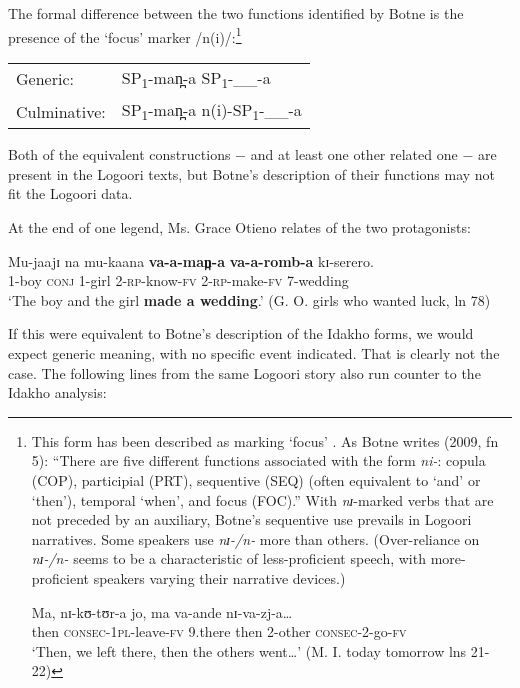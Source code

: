 \documentclass[output=paper]{langsci/langscibook}
\begin{document}
The formal difference between the two functions identified by Botne is the presence of the ‘focus’ marker /n(i)/:\footnote{ This form has been described as marking ‘focus’ \citep{Dalgish1979,Nurse2006,Botne2009}. As Botne writes (2009, fn 5): “There are five different functions associated with the form \textit{ni-}: copula (COP), participial (PRT), sequentive (SEQ) (often equivalent to ‘and’ or ‘then’), temporal ‘when’, and focus (FOC).” With \textit{nɪ}{}-marked verbs that are not preceded by an auxiliary, Botne’s sequentive use prevails in Logoori narratives. Some speakers use \textit{nɪ-/n- }more than others. (Over-reliance on \textit{nɪ-/n-} seems to be a characteristic of less-proficient speech, with more-proficient speakers varying their narrative devices.)  

\gll Ma,   nɪ-kʊ-tʊr-a     jo,  ma   va-ande     nɪ-va-zj-a…  \\
then  \textsc{consec}{}-\textsc{1pl-}leave-\textsc{fv}  9.there  then  2-other    \textsc{consec}{}-2-go-\textsc{fv}\\

‘Then, we left there, then the others went…’ (M. I. today tomorrow lns 21-22)}

\begin{tabular}{ll}
Generic:  & SP\textsubscript{1}{}-man̪-a   SP\textsubscript{1}{}-\_\_-a \\
Culminative:  & SP\textsubscript{1}{}-man̪-a  n(i)-SP\textsubscript{1}{}-\_\_-a
\end{tabular}

Both of the equivalent constructions $-$ and at least one other related one $-$ are present in the Logoori texts, but Botne’s description of their functions may not fit the Logoori data.

At the end of one legend, Ms. Grace Otieno relates of the two protagonists:

\ea\label{ex:sarvasy:26}
\gll Mu-jaajɪ   na   mu-kaana   \textbf{va-a-man̪-a}   \textbf{va-a-romb-a}     kɪ-serero. \\
1-boy    \textsc{conj}  1-girl    2-\textsc{rp}{}-know-\textsc{fv}  2-\textsc{rp}-make-\textsc{fv}  7-wedding \\
\glt ‘The boy and the girl \textbf{made a wedding}.’ (G. O. girls who wanted luck, ln 78)
\z

If this were equivalent to Botne’s description of the Idakho forms, we would expect generic meaning, with no specific event indicated. That is clearly not the case. The following lines from the same Logoori story also run counter to the Idakho analysis: 
\end{document}
